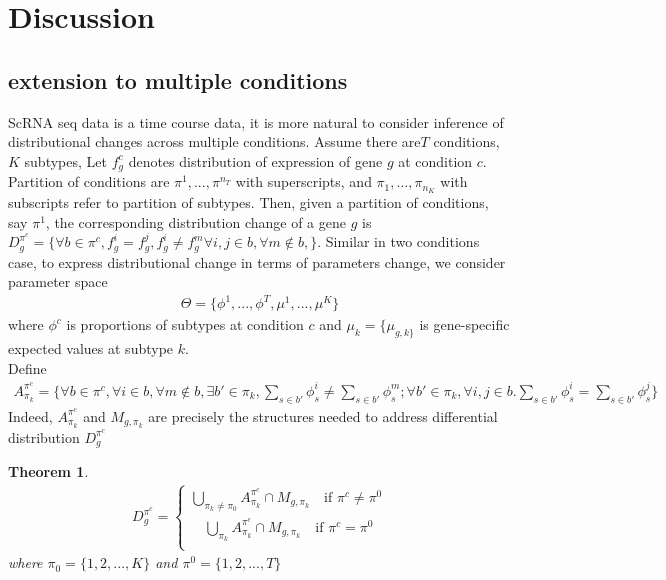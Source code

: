 \documentclass[11pt]{amsart}
\newtheorem{theorem}{Theorem}
\begin{document}
\section{Discussion}
\subsection{extension to multiple conditions}
ScRNA seq data is a time course data, it is more natural to consider inference of distributional changes across multiple conditions. Assume there are$T$ conditions, $K$ subtypes,  Let $f_g^c$ denotes distribution of expression of gene $g$ at condition $c$. Partition of conditions are $\pi^1,...,\pi^{n_T}$ with superscripts, and $\pi_1,...,\pi_{n_K}$ with subscripts refer to partition of subtypes. Then, given a partition of conditions, say $\pi^1$, the corresponding distribution change of a gene $g$ is $D_g^{\pi^c} = \{\forall b\in \pi^c, f_g^i = f_g^j, f_g^i \neq f_g^m \forall i,j \in b, \forall m \notin b, \}$. Similar in two conditions case, to express distributional change in terms of parameters change, we consider parameter space 
\begin{eqnarray*}
\Theta = \{\phi^1, ..., \phi^T, \mu^1, ..., \mu^K\}
\end{eqnarray*}
where $\phi^c$ is proportions of subtypes at condition $c$ and $\mu_k = \{\mu_{g,k\}}$ is gene-specific expected values at subtype $k$. \\
Define
\begin{eqnarray*}
A_{\pi_k}^{\pi^c} = \{\forall b \in \pi^c, \forall i \in b, \forall m \notin b, \exists b' \in \pi_k, \underset{s\in b'}{\sum}\phi_s^i \neq \underset{s\in b'}\sum\phi_s^m;
\forall b' \in \pi_k, \forall i, j \in b. \underset{s\in b'}\sum\phi_s^i = \underset{s\in b'}\sum\phi_s^j\}
\end{eqnarray*}
Indeed, $A_{\pi_k}^{\pi^c}$ and $M_{g,\pi_k}$ are precisely the structures needed to address differential distribution $D_g^{\pi^c}$
\begin{theorem}
\begin{eqnarray*}
    D_g^{\pi^c} = \left\{
                \begin{array}{ll}
                 \underset{\pi_k \neq \pi_0}\bigcup A_{\pi_k}^{\pi^c}\cap M_{g,\pi_k} \quad \text{if } \pi^c \neq \pi^0 \\
                 \quad \underset{\pi_k}\bigcup A_{\pi_k}^{\pi^c}\cap M_{g,\pi_k}\quad \text{if } \pi^c = \pi^0\\             
                \end{array}
              \right.
\end{eqnarray*}
where $\pi_0 = \{1, 2, ..., K\}$ and $\pi^0 = \{1, 2, ..., T\}$
\end{theorem}
\newpage
\appendix
\end{document}
